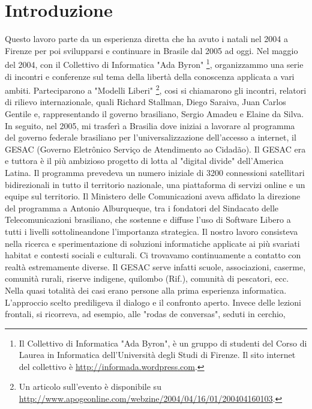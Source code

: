 
\chapter{Introduzione}
\label{Capitolo1}

Questo lavoro parte da un esperienza diretta che ha avuto i natali nel
2004 a Firenze per poi svilupparsi e continuare in Brasile dal 2005 ad
oggi. Nel maggio del 2004, con il Collettivo di Informatica "Ada
Byron" \footnote{Il Collettivo di Informatica "Ada Byron", è un gruppo
  di studenti del Corso di Laurea in Informatica dell’Università degli
  Studi di Firenze. Il sito internet del collettivo è
  \url{http://informada.wordpress.com}.}, organizzammo una serie di
incontri e conferenze sul tema della libertà della conoscenza
applicata a vari ambiti. Parteciparono a "Modelli Liberi" \footnote{Un
  articolo sull'evento è disponibile su
  \url{http://www.apogeonline.com/webzine/2004/04/16/01/200404160103}.},
cosi si chiamarono gli incontri, relatori di rilievo internazionale,
quali Richard Stallman, Diego Saraiva, Juan Carlos Gentile e,
rappresentando il governo brasiliano, Sergio Amadeu e Elaine da
Silva. In seguito, nel 2005, mi trasferì a Brasilia dove iniziai a
lavorare al programma del governo federale brasiliano per
l'universalizzazione dell'accesso a internet, il GESAC (Governo
Eletrônico Serviço de Atendimento ao Cidadão). Il GESAC era e tuttora
è il più ambizioso progetto di lotta al "digital divide" dell'America
Latina. Il programma prevedeva un numero iniziale di 3200 connessioni
satellitari bidirezionali in tutto il territorio nazionale, una
piattaforma di servizi online e un equipe sul territorio. Il Ministero
delle Comunicazioni aveva affidato la direzione del programma a
Antonio Alburqueque, tra i fondatori del Sindacato delle
Telecomunicazioni brasiliano, che sostenne e diffuse l'uso di Software
Libero a tutti i livelli sottolineandone l'importanza strategica. Il
nostro lavoro consisteva nella ricerca e sperimentazione di soluzioni
informatiche applicate ai più svariati habitat e contesti sociali e
culturali. Ci trovavamo continuamente a contatto con realtà
estremamente diverse. Il GESAC serve infatti scuole, associazioni,
caserme, comunità rurali, riserve indigene, quilombo (Rif.), comunità
di pescatori, ecc. Nella quasi totalità dei casi erano persone alla
prima esperienza informatica. L'approccio scelto prediligeva il
dialogo e il confronto aperto. Invece delle lezioni frontali, si
ricorreva, ad esempio, alle "rodas de conversas", seduti in cerchio,
